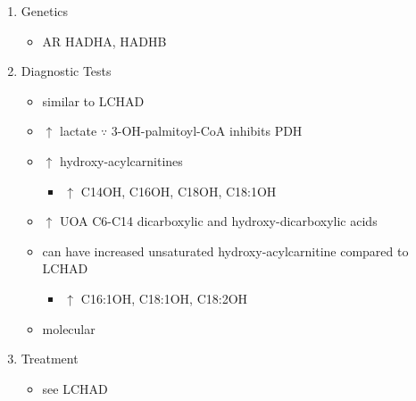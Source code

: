 \documentclass[12pt]{scrartcl}
\begin{document}
\begin{enumerate}
\item Genetics
\label{sec:orgded8f34}
\begin{itemize}
\item AR HADHA, HADHB
\end{itemize}

\item Diagnostic Tests
\label{sec:org06aa2be}
\begin{itemize}
\item similar to LCHAD
\item \(\uparrow\) lactate \(\because\) 3-OH-palmitoyl-CoA inhibits PDH
\item \(\uparrow\) hydroxy-acylcarnitines
\begin{itemize}
\item \(\uparrow\) C14OH, C16OH, C18OH, C18:1OH
\end{itemize}
\item \(\uparrow\) UOA C6-C14 dicarboxylic and hydroxy-dicarboxylic acids
\item can have increased unsaturated hydroxy-acylcarnitine compared to LCHAD
\begin{itemize}
\item \(\uparrow\) C16:1OH, C18:1OH, C18:2OH
\end{itemize}
\item molecular
\end{itemize}

\item Treatment
\label{sec:org75d9f35}
\begin{itemize}
\item see LCHAD
\end{itemize}
\end{enumerate}
\end{document}
